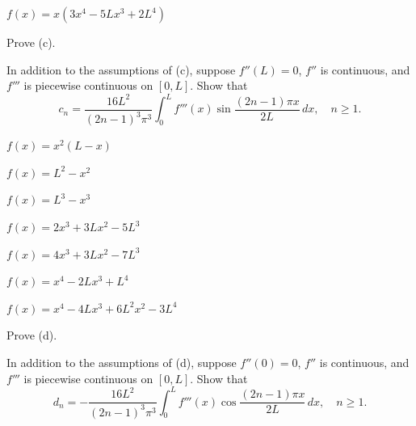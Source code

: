 \begin{exerciselist}
\item\label{exer:11.3.41}$f(x)=x(3x^4-5Lx^3+2L^4)$

\item\label{exer:11.3.42}\begin{alist}
\item %
Prove (c).
\item %
In addition to the assumptions of (c),
suppose
$f''(L)=0$, $f''$ is continuous, and $f'''$ is piecewise continuous on
$[0,L]$. Show that
\[
c_n=\frac{16L^2}{(2n-1)^3\pi^3}\int_0^L f'''(x)\sin\frac{(2n-1)\pi x}{2L}
\,dx,\quad n\ge1.
\]
\end{alist}




\item\label{exer:11.3.43}\Cex $f(x)=x^2(L-x)$

\item\label{exer:11.3.44}$f(x)=L^2-x^2$

\item\label{exer:11.3.45}$f(x)=L^3-x^3$

\item\label{exer:11.3.46}$f(x)=2x^3+3Lx^2-5L^3$

\item\label{exer:11.3.47}$f(x)=4x^3+3Lx^2-7L^3$

\item\label{exer:11.3.48}$f(x)=x^4-2Lx^3+L^4$

\item\label{exer:11.3.49}$f(x)=x^4-4Lx^3+6L^2x^2-3L^4$

\item\label{exer:11.3.50}\begin{alist}
\item %
Prove (d).
\item %
In addition to the assumptions of (d),
suppose
$f''(0)=0$, $f''$ is continuous, and $f'''$ is piecewise continuous on
$[0,L]$. Show that
\[
d_n=-\frac{16L^2}{(2n-1)^3\pi^3}\int_0^L f'''(x)\cos\frac{(2n-1)\pi x}{2L}
\,dx,\quad n\ge1.
\]
\end{alist}




\end{exerciselist}
